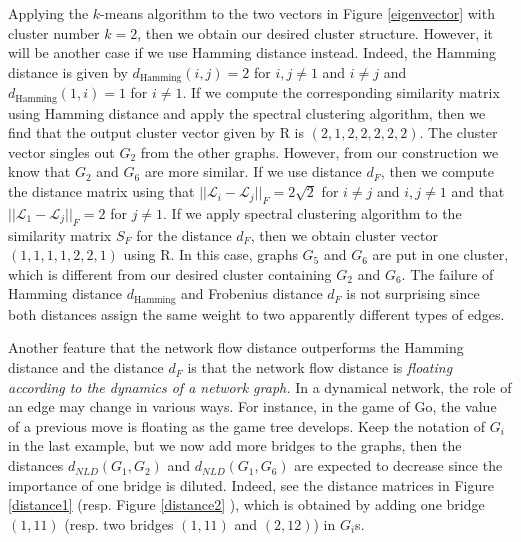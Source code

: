 \documentclass{amsart}
\begin{document}
%   	
%   	
   	
   	
    Applying the $k$-means algorithm to the two vectors in Figure \ref{eigenvector} with cluster number $k=2$, then we obtain our desired cluster structure. However, it will be another case if we use Hamming distance instead. Indeed, the Hamming distance is given by $d_{\text{Hamming}}(i,j)=2$ for $i,j\neq 1$ and $i\neq j$ and $d_{\text{Hamming}}(1,i)=1$ for $i\neq 1$. 
	If we compute the corresponding similarity matrix using Hamming distance and apply the spectral clustering algorithm, then we find that the output cluster vector given by \textsf{R} is $(2,1,2,2,2,2,2)$.  The cluster vector singles out $G_2$ from the other graphs.  However, from our construction we know that $G_2$ and $G_6$ are more similar. If we use distance  $d_{F}$, then we compute the distance matrix
	using that $||\mathcal{L}_i-\mathcal{L}_j||_{F}=2\sqrt{2} $ for $i\neq j$ and $i,j\neq 1$ and that $||\mathcal{L}_1-\mathcal{L}_j||_{F}=2$ for $j\neq 1$. If we apply spectral clustering algorithm to the similarity matrix $S_F$ for the distance $d_F$, then we obtain cluster vector  $(1,1,1,1,2,2,1)$ using \textsf{R}. In this case, graphs $G_5$ and $G_6$ are put in one cluster, which is different from our desired cluster containing $G_2$ and $G_6$. 
	The failure of Hamming distance $d_{\text{Hamming}}$ and Frobenius distance  $d_F$  is not  surprising since both distances assign the same weight to two apparently different types of edges.
	
		Another feature that the network flow distance outperforms the Hamming distance and the distance $d_F$ is that the network flow distance is \emph{floating according to the dynamics of a network graph. }
	In a dynamical network, the role of an edge may change in various ways.  For instance, in the game of Go, the value of a previous move is floating as the game tree develops.  Keep the notation of $G_i$ in the last example,	
but we now add more bridges to the graphs, then the  distances $d_{NLD}(G_1,G_2)$ and $d_{NLD}(G_1,G_6)$ are expected to decrease since the importance of one bridge is diluted. Indeed, see the distance matrices in Figure \ref{distance1} (resp. Figure \ref{distance2} ), which is obtained by adding one bridge $(1,11)$ (resp. two bridges $(1,11)$ and $(2,12)$) in $G_i$s.
\end{document}
